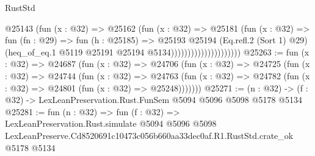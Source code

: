 \begin{lexlean}{RustStd}
\begin{coremodule}
                                    @25143
                                      (fun (x : @32) =>
                                      @25162
                                        (fun (x : @32) =>
                                        @25181
                                          (fun (x : @32) =>
                                          fun (fn : @29) =>
                                          fun (h : @25185) =>
                                          @25193
                                            @25194
                                            (Eq.refl.{2} (Sort 1) @29)
                                            (heq_of_eq.{1}
                                              @5119
                                              @25191
                                              @25194
                                              @5134)))))))))))))))))))))
@25263 := fun (x : @32) =>
  @24687
    (fun (x : @32) =>
    @24706
      (fun (x : @32) =>
      @24725
        (fun (x : @32) =>
        @24744
          (fun (x : @32) =>
          @24763 (fun (x : @32) => @24782 (fun (x : @32) => @24801 (fun (x : @32) => @25248)))))))
@25271 := (n : @32) -> (f : @32) -> LexLeanPreservation.Rust.FunSem @5094 @5096 @5098 @5178 @5134
@25281 := fun (n : @32) =>
  fun (f : @32) =>
  LexLeanPreservation.Rust.simulate
    @5094
    @5096
    @5098
    LexLeanPreserve.Cd8520691c10473c056b660aa33dec0af.R1.RustStd.crate_ok
    @5178
    @5134
\end{coremodule}
\end{lexlean}
